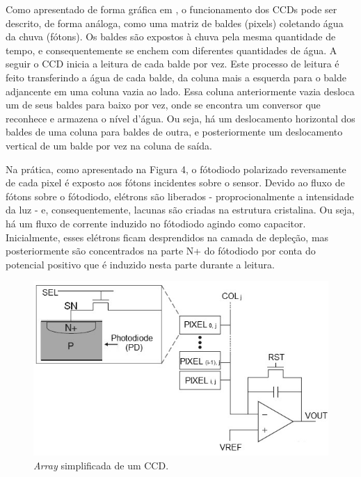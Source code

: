 \documentclass[10pt,a4paper,twocolumn]{article}
\begin{document}
	Como apresentado de forma gráfica em \cite{Spectral}, o funcionamento dos CCDs pode ser descrito, de forma análoga, como uma matriz de baldes (pixels) coletando água da chuva (fótons). Os baldes são expostos à chuva pela mesma quantidade de tempo, e consequentemente se enchem com diferentes quantidades de água. A seguir o CCD inicia a leitura de cada balde por vez. Este processo de leitura é feito transferindo a água de cada balde, da coluna mais a esquerda para o balde adjancente em uma coluna vazia ao lado. Essa coluna anteriormente vazia desloca um de seus baldes para baixo por vez, onde se encontra um conversor que reconhece e armazena o nível d'água. Ou seja, há um deslocamento horizontal dos baldes de uma coluna para baldes de outra, e posteriormente um deslocamento vertical de um balde por vez na coluna de saída.
	
	Na prática, como apresentado na Figura 4, o fótodiodo polarizado reversamente de cada pixel é exposto aos fótons incidentes sobre o sensor. Devido ao fluxo de fótons sobre o fótodiodo, elétrons são liberados - proprocionalmente a intensidade da luz - e, consequentemente, lacunas são criadas na estrutura cristalina. Ou seja, há um fluxo de corrente induzido no fótodiodo agindo como capacitor. Inicialmente, esses elétrons ficam desprendidos na camada de depleção, mas posteriormente são concentrados na parte N+ do fótodiodo por conta do potencial positivo que é induzido nesta parte durante a leitura.
	
	\begin{figure}[H]
	\centering
	\includegraphics[scale=0.5]{imagens/passive-pixel.jpg}
	\caption{\textit{Array} simplificada de um CCD.}
	\end{figure}
	
\end{document}

